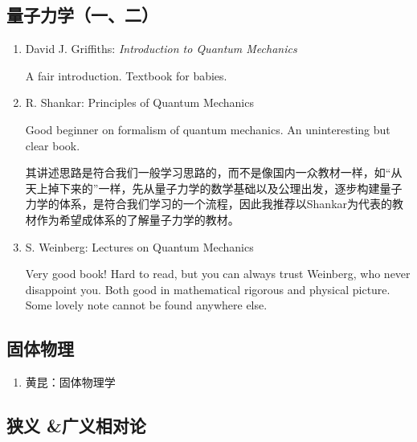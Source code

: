 \subsection*{量子力学（一、二）}

\begin{enumerate}
  \item David J. Griffiths: \textit{Introduction to Quantum Mechanics}

  A fair introduction. Textbook for babies.
  \item R. Shankar: Principles of Quantum Mechanics

  Good beginner on formalism of quantum mechanics. An uninteresting but clear book.

  其讲述思路是符合我们一般学习思路的，而不是像国内一众教材一样，如“从天上掉下来的”一样，先从量子力学的数学基础以及公理出发，逐步构建量子力学的体系，是符合我们学习的一个流程，因此我推荐以Shankar为代表的教材作为希望成体系的了解量子力学的教材。

  \item S. Weinberg: Lectures on Quantum Mechanics

  Very good book! Hard to read, but you can always trust Weinberg, who never disappoint you. Both good in mathematical rigorous and physical picture. Some lovely note cannot be found anywhere else.
\end{enumerate}

\subsection*{固体物理}

\begin{enumerate}
  \item 黄昆：固体物理学
\end{enumerate}

\subsection*{狭义 \&广义相对论}

